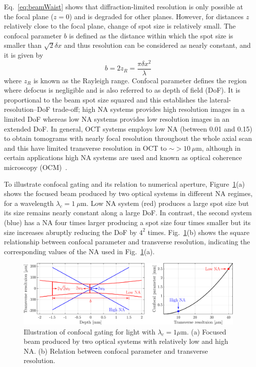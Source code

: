 Eq.~\ref{eq:beamWaist} shows that diffraction-limited resolution is only possible at the focal plane ($z=0$) and is degraded for other planes. However, for distances $z$ relatively close to the focal plane, change of spot size is relatively small. The confocal parameter $b$ is defined as the distance within which the spot size is smaller than $\sqrt{2}\delta x$ and thus resolution can be considered as nearly constant, and it is given by~\cite{Ralston2005_Deconvolution}
\begin{equation}
    b = 2z_R = \frac{\pi\delta x^2}{\lambda}
\end{equation}
where $z_R$ is known as the Rayleigh range. Confocal parameter defines the region where defocus is negligible and is also referred to as depth of field (DoF). It is proportional to the beam spot size squared and this establishes the lateral-resolution--DoF trade-off; high NA systems provides high resolution images in a limited DoF whereas low NA systems provides low resolution images in an extended DoF. In general, OCT systems employs low NA (between 0.01 and 0.15) to obtain tomograms with nearly focal resolution throughout the whole axial scan and this have limited transverse resolution in OCT to $\sim>10~\mu$m, although in certain applications high NA systems are used and known as optical coherence microscopy (OCM)~\cite{Fujimoto2015_Introduction}.

To illustrate confocal gating and its relation to numerical aperture, Figure~\ref{fig:ConfocalScan}(a) shows the focused beam produced by two optical systems in different NA regimes, for a wavelength $\lambda_c = 1~\mu$m. Low NA system (red) produces a large spot size but its size remains nearly constant along a large DoF. In contrast, the second system (blue) has a NA four times larger producing a spot size four times smaller but its size increases abruptly reducing the DoF by $4^2$ times. Fig.~\ref{fig:ConfocalScan}(b) shows the square relationship between confocal parameter and transverse resolution, indicating the corresponding values of the NA used in Fig.~\ref{fig:ConfocalScan}(a).

\begin{figure}[htb!]
    \centering
    \includegraphics[width=\textwidth]{Figures/TheoreticalBasis/ConfocalScan.pdf}
    \caption{Illustration of confocal gating for light with $\lambda_c = 1\mu$m. (a) Focused beam produced by two optical systems with relatively low and high NA. (b) Relation between confocal parameter and transverse resolution.}
    \label{fig:ConfocalScan}
\end{figure}

